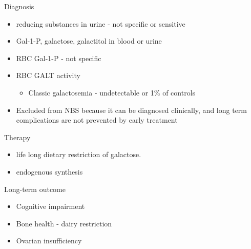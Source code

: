 \documentclass[presentation, smaller]{beamer}
\begin{document}
\begin{frame}[label={sec:orgd4285c2}]{Diagnosis}
\begin{itemize}
\item reducing substances in urine - not specific or sensitive
\item Gal-1-P, galactose, galactitol in blood or urine
\item RBC Gal-1-P - not specific
\item RBC GALT activity
\begin{itemize}
\item Classic galactosemia - undetectable or 1\% of controls
\end{itemize}

\item Excluded from NBS because it can be diagnosed clinically, and long term complications are not prevented by early treatment
\end{itemize}
\end{frame}

\begin{frame}[label={sec:org6a47a80}]{Therapy}
\begin{itemize}
\item life long dietary restriction of galactose.
\item endogenous synthesis
\end{itemize}
\end{frame}
\begin{frame}[label={sec:orge960939}]{Long-term outcome}
\begin{itemize}
\item Cognitive impairment
\item Bone health - dairy restriction
\item Ovarian insufficiency
\end{itemize}
\end{frame}
\end{document}
